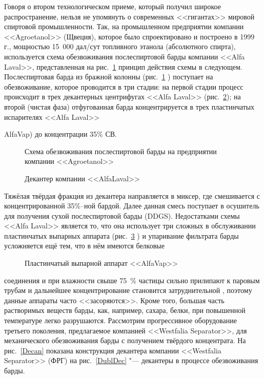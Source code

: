 Говоря о втором технологическом приеме, который получил широкое распространение, нельзя не упомянуть о современных <<гигантах>> мировой спиртовой промышленности. 
Так, на промышленном предприятии компании <<Agroetanol>> (Щвеция), которое было спроектировано и построено в 1999 г., мощностью 15~000 дал/сут топливного этанола (абсолютного спирта), используется схема обезвоживания послеспиртовой барды компании <<Alfa Laval>>, представленная на рис.~\ref{Agroetanol} принцип действия схемы в следующем. 
Послеспиртовая барда из бражной колонны (рис.~\ref{Agroetanol} ) поступает на обезвоживание, которое проводится в три стадии: на первой стадии процесс происходит в трех декантерных центрифугах <<Alfa Laval>> (рис.~\ref{Decantor}); на второй (чистая фаза) отфугованная барда концентрируется в трех пластинчатых испарителях <<Alfa Laval>> {AlfaVap) до концентрации 35\% СВ. 

\begin{figure}[h!] 
\centering 
\begin{small} 
\def\svgwidth{0.8\linewidth} 
 
\end{small} 
\caption{Схема обезвоживания послеспиртовой барды на предприятии компании <<Agroetanol>>} 
\label{Agroetanol} 
\end{figure} 

\begin{figure}[h!] 
 \caption{Декантер компании <<AlfaLaval>>} 
\label{Decantor} 
\end{figure} 

Тяжёлая твёрдая фракция из декантера направляется в миксер, где смешивается с концентрированной 35\%--ной бардой. Далее данная смесь поступает в осушитель для получения сухой послеспиртовой барды (DDGS). 
Недостатками схемы <<Alfa Laval>> является то, что она использует три сложных в обслуживании пластинчатых выпарных аппарата (рис.~\ref{Plast} ) и упаривание фильтрата барды усложняется ещё тем, что в нём имеются белковые 

\begin{figure}
\centering
\begin{small} 
\def\svgwidth{1\linewidth} 
 
\end{small} 
\caption{Пластинчатый выпарной аппарат <<AlfaVap>>} 
\label{Plast} 
\end{figure} 

соединения и при влажности свыше 75~\% частицы сильно прилипают к паровым трубам и дальнейшее концентрирование становится затруднительной \cite{Fuks_1951}, поэтому данные аппараты часто <<засоряются>>. 
Кроме того, большая часть растворимых веществ барды, как, например, сахара, белки, при повышенной температуре легко разрушаются. 
Рассмотрим прогрессивное оборудование третьего поколения, предлагаемое компанией <<Westfalia Separator>>, для механического обезвоживания барды с получением твёрдого концентрата.
На рис.~\ref{Decan} показана конструкция декантера компании <<Westfalia Separator>> (ФРГ) на рис.~\ref{DublDec} "--- декантеры в процессе обезвоживания барды. 

}

